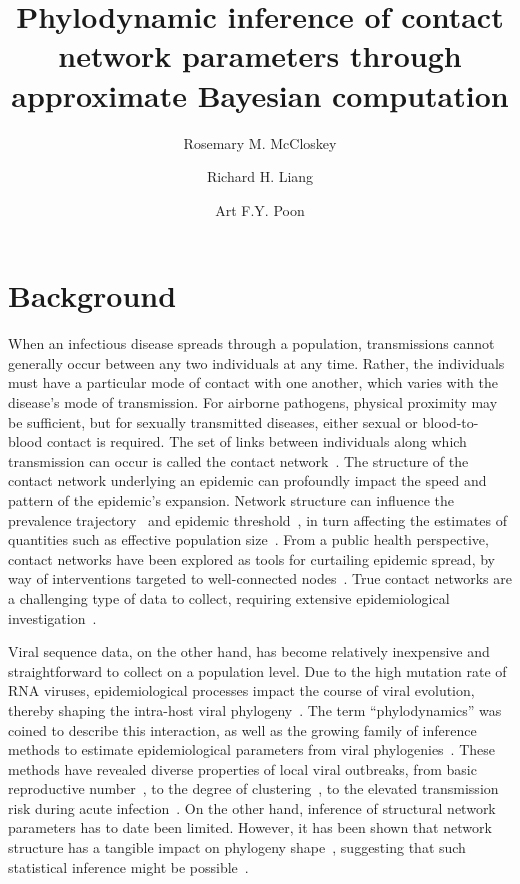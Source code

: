 \documentclass[12pt]{article}\usepackage[]{graphicx}\usepackage[]{color}
\title{Phylodynamic inference of contact network parameters through approximate
Bayesian computation}
\author{Rosemary M. McCloskey \and Richard H. Liang \and Art F.Y. Poon}
\begin{document}
\maketitle

\section*{Background}

When an infectious disease spreads through a population, transmissions cannot
generally occur between any two individuals at any time. Rather, the
individuals must have a particular mode of contact with one another, which
varies with the disease's mode of transmission. For airborne pathogens,
physical proximity may be sufficient, but for sexually transmitted diseases,
either sexual or blood-to-blood contact is required. The set of links between
individuals along which transmission can occur is called the contact
network~\autocite{klovdahl1985social}. The structure of the contact network
underlying an epidemic can profoundly impact the speed and pattern of the
epidemic's expansion. Network structure can influence the prevalence
trajectory~\autocite{o2010contact} and epidemic
threshold~\autocite{barthelemy2005dynamical}, in turn affecting the estimates
of quantities such as effective population
size~\autocite{goodreau2006assessing}. From a public health perspective,
contact networks have been explored as tools for curtailing epidemic spread, by
way of interventions targeted to well-connected
nodes~\autocite{wang2015targeting}. True contact networks are a challenging
type of data to collect, requiring extensive epidemiological
investigation~\autocite{welch2011statistical}.

Viral sequence data, on the other hand, has become relatively inexpensive and
straightforward to collect on a population level. Due to the high mutation rate
of RNA viruses, epidemiological processes impact the course of viral evolution,
thereby shaping the intra-host viral
phylogeny~\autocite{drummond2003measurably}. The term ``phylodynamics'' was
coined to describe this interaction, as well as the growing family of inference
methods to estimate epidemiological parameters from viral
phylogenies~\autocite{grenfell2004unifying}. These methods have revealed
diverse properties of local viral outbreaks, from basic reproductive
number~\autocite{stadler2011estimating}, to the degree of
clustering~\autocite{hughes2009molecular}, to the elevated transmission risk
during acute infection~\autocite{volz2012simple}. On the other hand, inference
of structural network parameters has to date been limited. However, it has been
shown that network structure has a tangible impact on phylogeny
shape~\autocite{leventhal2012inferring, colijn2014phylogenetic,
goodreau2006assessing, robinson2013dynamics}, suggesting that such statistical
inference might be possible~\autocite{welch2011statistical}.
\end{document}
